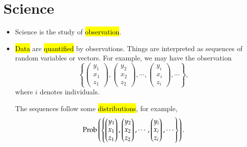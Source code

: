 \documentclass{Theme}
\begin{document}
\section{Science}
\begin{itemize}
    \item Science is the study of \hl{observation}.
    \item \hl{Data} are \hl{quantified} by observations.
    Things are interpreted as sequences of random variables
    or vectors. For example, we may have the observation
    \[
        \left\{
        \begin{pmatrix}
        y_1 \\ x_1 \\ z_1
        \end{pmatrix},
        \begin{pmatrix}
        y_2 \\ x_2 \\ z_2
        \end{pmatrix},\cdots,
        \begin{pmatrix}
        y_i \\ x_i \\ z_i
        \end{pmatrix},\cdots
        \right\},
    \]
    where $i$ denotes individuals.
    
    The sequences follow some \hl{distributions},
    for example, 
    \[
    \text{Prob}\left(\left\{
        \begin{pmatrix}
        y_1 \\ x_1 \\ z_1
        \end{pmatrix},
        \begin{pmatrix}
        y_2 \\ x_2 \\ z_2
        \end{pmatrix},\cdots,
        \begin{pmatrix}
        y_i \\ x_i \\ z_i
        \end{pmatrix},\cdots
        \right\}\right).
    \]
    

\end{itemize}
\end{document}
